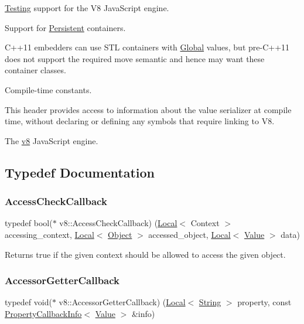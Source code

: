 \mbox{\hyperlink{classv8_1_1Testing}{Testing}} support for the V8 Java\+Script engine.

Support for \mbox{\hyperlink{classv8_1_1Persistent}{Persistent}} containers.

C++11 embedders can use S\+TL containers with \mbox{\hyperlink{classv8_1_1Global}{Global}} values, but pre-\/\+C++11 does not support the required move semantic and hence may want these container classes.

Compile-\/time constants.

This header provides access to information about the value serializer at compile time, without declaring or defining any symbols that require linking to V8.

The \mbox{\hyperlink{namespacev8}{v8}} Java\+Script engine. 

\subsection{Typedef Documentation}
\mbox{\label{namespacev8_a1024fb358d107c1494163217830688e6}} 
\subsubsection{\texorpdfstring{Access\+Check\+Callback}{AccessCheckCallback}}
{\footnotesize\ttfamily typedef bool($\ast$ v8\+::\+Access\+Check\+Callback) (\mbox{\hyperlink{classv8_1_1Local}{Local}}$<$ Context $>$ accessing\+\_\+context, \mbox{\hyperlink{classv8_1_1Local}{Local}}$<$ \mbox{\hyperlink{classv8_1_1Object}{Object}} $>$ accessed\+\_\+object, \mbox{\hyperlink{classv8_1_1Local}{Local}}$<$ \mbox{\hyperlink{classv8_1_1Value}{Value}} $>$ data)}

Returns true if the given context should be allowed to access the given object. \mbox{\label{namespacev8_a722613c87061708a4f1aa050d095f868}} 
\subsubsection{\texorpdfstring{Accessor\+Getter\+Callback}{AccessorGetterCallback}}
{\footnotesize\ttfamily typedef void($\ast$ v8\+::\+Accessor\+Getter\+Callback) (\mbox{\hyperlink{classv8_1_1Local}{Local}}$<$ \mbox{\hyperlink{classv8_1_1String}{String}} $>$ property, const \mbox{\hyperlink{classv8_1_1PropertyCallbackInfo}{Property\+Callback\+Info}}$<$ \mbox{\hyperlink{classv8_1_1Value}{Value}} $>$ \&info)}

